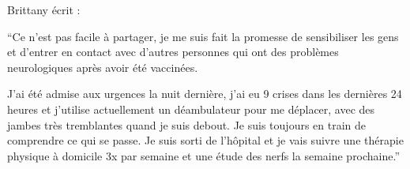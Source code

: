 Brittany écrit :

“Ce n'est pas facile à partager, je me suis fait la promesse de sensibiliser les
gens et d'entrer en contact avec d'autres personnes qui ont des problèmes
neurologiques après avoir été vaccinées.

J'ai été admise aux urgences la nuit dernière, j'ai eu 9 crises dans les
dernières 24 heures et j'utilise actuellement un déambulateur pour me déplacer,
avec des jambes très tremblantes quand je suis debout. Je suis toujours en train
de comprendre ce qui se passe. Je suis sorti de l'hôpital et je vais suivre une
thérapie physique à domicile 3x par semaine et une étude des nerfs la semaine
prochaine.”
